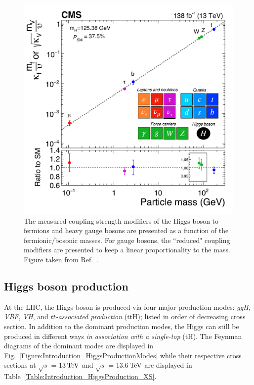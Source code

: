 \begin{figure}[!htbp]
\centering
\includegraphics[width= .7\textwidth]{Figures/Introduction/CMS_Higgs_FermionCouplings.pdf}
\caption[Measured Higgs coupling modifiers versus fermion and boson masses]{The measured coupling strength modifiers of the Higgs boson to fermions and heavy gauge bosons are presented as a function of the fermionic/bosonic masses. For gauge bosons, the ``reduced" coupling modifiers are presented to keep a linear proportionality to the mass. Figure taken from Ref.~\cite{CMS_Couplings_Measurement}.}
\label{Figure:Introduction_CMScouplings}
\end{figure}

\subsection{Higgs boson production}

At the \ac{LHC}, the Higgs boson is produced via four major production modes: \textit{\ac{ggH}}, \textit{\ac{VBF}}, \textit{\ac{VH}}, and \textit{$t\overline{t}$-associated production} (ttH); listed in order of decreasing cross section. In addition to the dominant production modes, the Higgs can still be produced in different ways \eg \textit{in association with a single-top} (tH). The Feynman diagrams of the dominant modes are displayed in Fig.~\ref{Figure:Introduction_HiggsProductionModes} while their respective cross sections at $\sqrt{s}$ = 13$\,\text{Te\hspace{-.08em}V}$ and $\sqrt{s}$ = 13.6$\,\text{Te\hspace{-.08em}V}$ are displayed in Table~\ref{Table:Introduction_HiggsProduction_XS}. 


